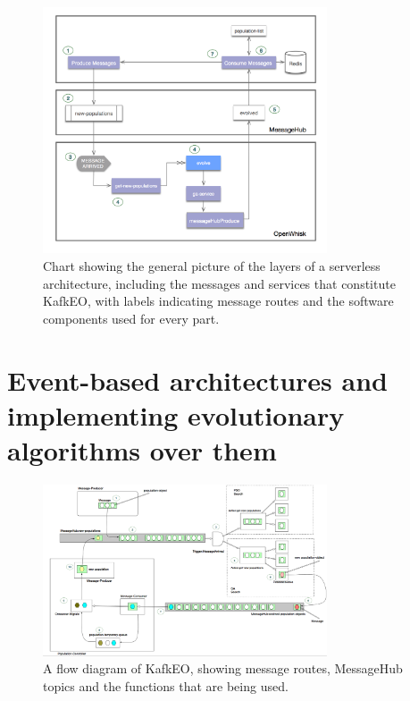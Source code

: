 \documentclass{llncs}
\begin{document}
  \begin{figure}[h!tb]
    \centering
  \includegraphics[width=0.75\textwidth]{img/kafka.png}
  \caption{Chart showing the general picture of the layers of a
    serverless architecture, including the messages and services that
    constitute KafkEO, with labels indicating message
    routes and the software components used for every part.}
  \label{fig:kafkeo}
  \end{figure}
  
  \section{Event-based architectures and implementing evolutionary
    algorithms over them}
  \label{sec:methods}
  \begin{figure}[h!tb]
  \includegraphics[width=0.75\textwidth]{img/kafkEO.png}
  \caption{A flow diagram of KafkEO, showing message routes, MessageHub
    topics and the functions that are being used.}
  \label{fig:kafkeo2}
  \end{figure}
  
\end{document}
